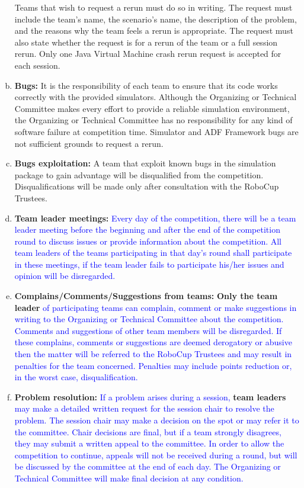 \documentclass{article}
\begin{document}
\begin{enumerate}[(a)]
Teams that wish to request a rerun must do so in writing. The request must include the team's name, the scenario's name, the description of the problem, and the reasons why the team feels a rerun is appropriate. The request must also state whether the request is for a rerun of the team or a full session rerun. Only one Java Virtual Machine crash rerun request is accepted for each session.
\item \textbf{Bugs:} It is the responsibility of each team to ensure that its code works correctly with the provided simulators. Although the Organizing or Technical Committee makes every effort to provide a reliable simulation environment, the Organizing or Technical Committee has no responsibility for any kind of software failure at competition time. Simulator and ADF Framework bugs are not sufficient grounds to request a rerun.
\item \textbf{Bugs exploitation:} A team that exploit known bugs in the simulation package to gain advantage will be disqualified from the competition. Disqualifications will be made only after consultation with the RoboCup Trustees. \label{item:bug_exploitation}
\item \textbf{Team leader meetings:} \textcolor{blue}{Every day of the competition, there will be a team leader meeting before the beginning and after the end of the competition round to discuss issues or provide information about the competition. All team leaders of the teams participating in that day's round shall participate in these meetings, if the team leader fails to participate his/her issues and opinion will be disregarded.}
\item \textbf{Complains/Comments/Suggestions from teams:} \textbf{Only the team leader} \textcolor{blue}{of participating teams can complain, comment or make suggestions in writing to the Organizing or Technical Committee about the competition. Comments and suggestions of other team members will be disregarded. If these complains, comments or suggestions are deemed derogatory or abusive then the matter will be referred to the RoboCup Trustees and may result in penalties for the team concerned. Penalties may include points reduction or, in the worst case, disqualification.}
\item \textbf{Problem resolution:} \textcolor{blue}{If a problem arises during a session,} \textbf{team leaders} \textcolor{blue}{may make a detailed written request for the session chair to resolve the problem. The session chair may make a decision on the spot or may refer it to the committee. Chair decisions are final, but if a team strongly disagrees, they may submit a written appeal to the committee. In order to allow the competition to continue, appeals will not be received during a round, but will be discussed by the committee at the end of each day. The Organizing or Technical Committee will make final decision at any condition.}

\end{enumerate}
\end{document}
